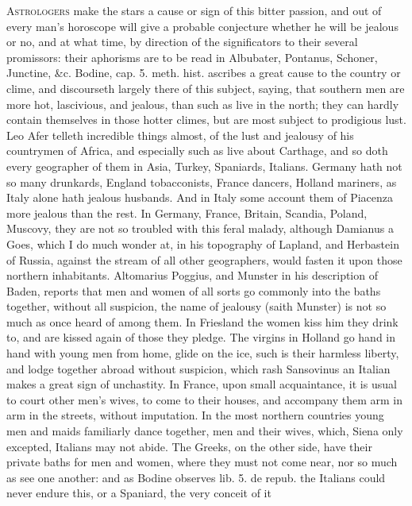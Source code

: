 {\lettrine{A}{strologers} make the stars a cause or sign of this bitter passion, and
out of every man's horoscope will give a probable conjecture whether he
will be jealous or no, and at what time, by direction of the
significators to their several promissors: their aphorisms are to be
read in Albubater, Pontanus, Schoner, Junctine, \&c. Bodine, cap. 5.
meth. hist. ascribes a great cause to the country or clime, and
discourseth largely there of this subject, saying, that southern men
are more hot, lascivious, and jealous, than such as live in the north;
they can hardly contain themselves in those hotter climes, but are most
subject to prodigious lust. Leo Afer telleth incredible things almost,
of the lust and jealousy of his countrymen of Africa, and especially
such as live about Carthage, and so doth every geographer of them in
Asia, Turkey, Spaniards, Italians. Germany hath not so many
drunkards, England tobacconists, France dancers, Holland mariners, as
Italy alone hath jealous husbands. And in Italy some account them
of Piacenza more jealous than the rest. In Germany, France,
Britain, Scandia, Poland, Muscovy, they are not so troubled with this
feral malady, although Damianus a Goes, which I do much wonder at, in
his topography of Lapland, and Herbastein of Russia, against the stream
of all other geographers, would fasten it upon those northern
inhabitants. Altomarius Poggius, and Munster in his description of
Baden, reports that men and women of all sorts go commonly into the
baths together, without all suspicion, the name of jealousy (saith
Munster) is not so much as once heard of among them. In Friesland the
women kiss him they drink to, and are kissed again of those they
pledge. The virgins in Holland go hand in hand with young men from
home, glide on the ice, such is their harmless liberty, and lodge
together abroad without suspicion, which rash Sansovinus an Italian
makes a great sign of unchastity. In France, upon small acquaintance,
it is usual to court other men's wives, to come to their houses, and
accompany them arm in arm in the streets, without imputation. In the
most northern countries young men and maids familiarly dance together,
men and their wives, which, Siena only excepted, Italians may not
abide. The Greeks, on the other side, have their private baths
for men and women, where they must not come near, nor so much as see
one another: and as Bodine observes lib. 5. de repub. the
Italians could never endure this, or a Spaniard, the very conceit of it
}
